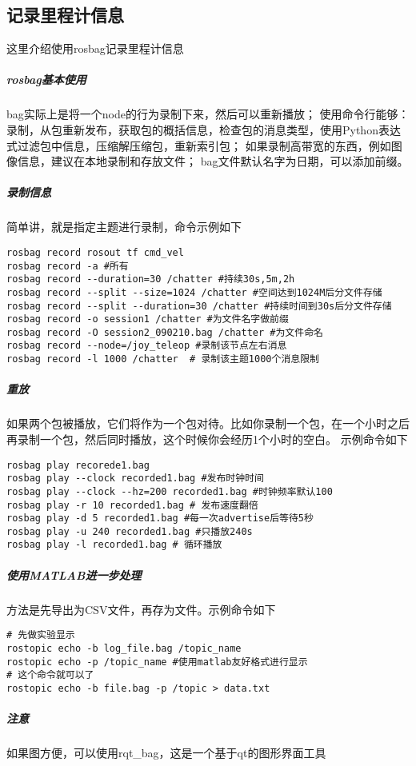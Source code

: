 \documentclass[a4paper,twoside,cs4size,fancyhdr,notitlepage]{ctexart}
\begin{document}
\subsection{记录里程计信息}
这里介绍使用rosbag记录里程计信息
\subparagraph{rosbag基本使用}
bag实际上是将一个node的行为录制下来，然后可以重新播放；
使用命令行能够：录制，从包重新发布，获取包的概括信息，检查包的消息类型，使用Python表达式过滤包中信息，压缩解压缩包，重新索引包；
如果录制高带宽的东西，例如图像信息，建议在本地录制和存放文件；
bag文件默认名字为日期，可以添加前缀。
\subparagraph{录制信息}
简单讲，就是指定主题进行录制，命令示例如下
\begin{lstlisting}
rosbag record rosout tf cmd_vel
rosbag record -a #所有
rosbag record --duration=30 /chatter #持续30s,5m,2h
rosbag record --split --size=1024 /chatter #空间达到1024M后分文件存储
rosbag record --split --duration=30 /chatter #持续时间到30s后分文件存储
rosbag record -o session1 /chatter #为文件名字做前缀
rosbag record -O session2_090210.bag /chatter #为文件命名
rosbag record --node=/joy_teleop #录制该节点左右消息
rosbag record -l 1000 /chatter  # 录制该主题1000个消息限制
\end{lstlisting}
\subparagraph{重放}
如果两个包被播放，它们将作为一个包对待。比如你录制一个包，在一个小时之后再录制一个包，然后同时播放，这个时候你会经历1个小时的空白。
示例命令如下
\begin{lstlisting}
rosbag play recorede1.bag
rosbag play --clock recorded1.bag #发布时钟时间
rosbag play --clock --hz=200 recorded1.bag #时钟频率默认100
rosbag play -r 10 recorded1.bag # 发布速度翻倍
rosbag play -d 5 recorded1.bag #每一次advertise后等待5秒
rosbag play -u 240 recorded1.bag #只播放240s
rosbag play -l recorded1.bag # 循环播放
\end{lstlisting}
\subparagraph{使用MATLAB进一步处理}
方法是先导出为CSV文件，再存为文件。示例命令如下
\begin{lstlisting}
# 先做实验显示
rostopic echo -b log_file.bag /topic_name
rostopic echo -p /topic_name #使用matlab友好格式进行显示
# 这个命令就可以了
rostopic echo -b file.bag -p /topic > data.txt
\end{lstlisting}
\subparagraph{注意}
如果图方便，可以使用rqt\_bag，这是一个基于qt的图形界面工具
\end{document}
